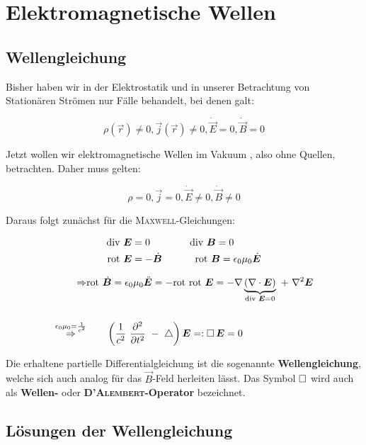 \chapter{Elektromagnetische Wellen}

\section{Wellengleichung}

Bisher haben wir in der Elektrostatik und in unserer Betrachtung von Stationären Strömen nur Fälle behandelt, bei denen galt:

\begin{equation*}
\rho(\vec{r})\neq 0, \vec{j}(\vec{r})\neq 0, \dot{\vec{E}}=0, \dot{\vec{B}}=0
\end{equation*}

Jetzt wollen wir elektromagnetische Wellen im Vakuum , also ohne Quellen, betrachten. Daher muss gelten: 

\begin{equation*}
\rho=0, \vec{j}=0,\dot{\vec{E}}\neq 0,\dot{\vec{B}}\neq 0
\end{equation*}

Daraus folgt zunächst für die \textsc{Maxwell}-Gleichungen:

\begin{align*}
\text{div } \bm{E} &=0 \qquad \qquad\text{div } \bm{B} = 0\\
\text{rot }  \bm{E} &= -\dot{\bm{B}} \qquad\quad \ \text{rot } \bm{B} = \epsilon_0\mu_0 \dot{\bm{E}}\\
\end{align*}

\begin{align*}
\Rightarrow & \text{rot }\dot{\bm{B}} = \epsilon_0\mu_0\ddot{\bm{E}} = -\text{rot }\text{rot }\bm{E} = -\nabla\underbrace{(\nabla\cdot\bm{E})}_{\text{div }\bm{E}=0} \ + \ \nabla^2 \bm{E}\\
\ \\
\overset{\epsilon_0\mu_0 = \frac{1}{c^2}}{\Rightarrow} &\qquad \left(\frac{1}{c^2} \ \frac{\partial ^2{}}{\partial{t}^2} \ - \ \mathop{{}\bigtriangleup}\nolimits\right)\bm{E} =: \mathop{{}\Box}\nolimits\bm{E} = 0
\end{align*}

Die erhaltene partielle Differentialgleichung ist die sogenannte \textbf{Wellengleichung}, welche sich auch analog für das $\vec{B}$-Feld herleiten lässt. Das Symbol $\mathop{{}\Box}\nolimits$ wird auch als \textbf{Wellen-} oder \textbf{\textsc{D'Alembert}-Operator} bezeichnet.


\section{Lösungen der Wellengleichung}

